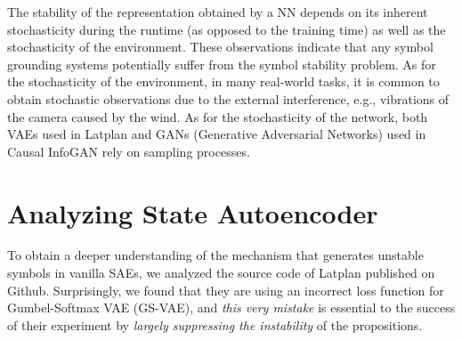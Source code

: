 
The stability of the representation obtained by a NN depends
on
its inherent stochasticity during the runtime (as opposed to the training time) as well as
the stochasticity of the environment.
% 
These observations indicate that any symbol grounding systems potentially suffer from 
the symbol stability problem.
% 
As for the stochasticity of the environment,
in many real-world tasks, it is common to obtain stochastic observations
due to the external interference, e.g., vibrations of the camera caused by the wind.
% 
As for the stochasticity of the network,
both
VAEs \cite{kingma2013auto,jang2016categorical,higgins2016beta} used in Latplan
and
GANs (Generative Adversarial Networks) \cite{goodfellow2014generative} used in Causal InfoGAN \cite{kurutach2018learning}
rely on sampling processes.

\section{Analyzing State Autoencoder}
\label{analysis}

To obtain a deeper understanding of the mechanism that generates
unstable symbols in vanilla SAEs, we
analyzed the source code of Latplan published on Github.
% 
Surprisingly, we found that they are using an incorrect loss function for Gumbel-Softmax VAE (GS-VAE),
and \emph{this very mistake} is essential to the success of their experiment
by \emph{largely suppressing the instability} of the propositions.


